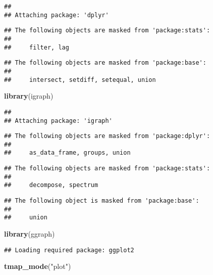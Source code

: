 \documentclass[]{article}
\newenvironment{Shaded}{\begin{snugshade}}{\end{snugshade}}
\newcommand{\KeywordTok}[1]{\textcolor[rgb]{0.13,0.29,0.53}{\textbf{#1}}}
\newcommand{\NormalTok}[1]{#1}
\newcommand{\StringTok}[1]{\textcolor[rgb]{0.31,0.60,0.02}{#1}}
\begin{document}
\begin{verbatim}
## 
## Attaching package: 'dplyr'
\end{verbatim}

\begin{verbatim}
## The following objects are masked from 'package:stats':
## 
##     filter, lag
\end{verbatim}

\begin{verbatim}
## The following objects are masked from 'package:base':
## 
##     intersect, setdiff, setequal, union
\end{verbatim}

\begin{Shaded}
\begin{Highlighting}[]
\KeywordTok{library}\NormalTok{(igraph)}
\end{Highlighting}
\end{Shaded}

\begin{verbatim}
## 
## Attaching package: 'igraph'
\end{verbatim}

\begin{verbatim}
## The following objects are masked from 'package:dplyr':
## 
##     as_data_frame, groups, union
\end{verbatim}

\begin{verbatim}
## The following objects are masked from 'package:stats':
## 
##     decompose, spectrum
\end{verbatim}

\begin{verbatim}
## The following object is masked from 'package:base':
## 
##     union
\end{verbatim}

\begin{Shaded}
\begin{Highlighting}[]
\KeywordTok{library}\NormalTok{(ggraph)}
\end{Highlighting}
\end{Shaded}

\begin{verbatim}
## Loading required package: ggplot2
\end{verbatim}

\begin{Shaded}
\begin{Highlighting}[]
\KeywordTok{tmap_mode}\NormalTok{(}\StringTok{"plot"}\NormalTok{)}
\end{Highlighting}
\end{Shaded}
\end{document}
